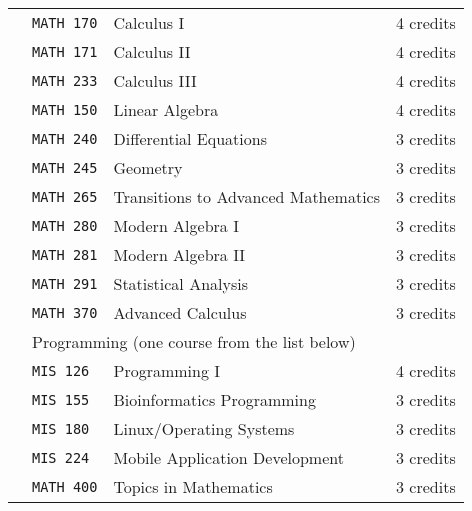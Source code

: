 \documentclass[letterpaper,10pt]{article}
\newcounter{cseNum}
\newcommand\csenumber{\stepcounter{cseNum}\arabic{cseNum}}
\begin{document}
\begin{tabular}{l l l l }
  \csenumber & \texttt{MATH 170} & Calculus I & 4 credits \\[4pt]
  \csenumber & \texttt{MATH 171} & Calculus II  & 4 credits \\[4pt]
  \csenumber & \texttt{MATH 233} & Calculus III  & 4 credits \\[4pt]
  \csenumber & \texttt{MATH 150} & Linear Algebra & 4 credits \\[4pt]
  \csenumber & \texttt{MATH 240} & Differential Equations & 3 credits \\[4pt]
  \csenumber & \texttt{MATH 245} & Geometry               & 3 credits \\[4pt]
  \csenumber & \texttt{MATH 265} & Transitions to Advanced Mathematics & 3 credits \\[4pt]
  \csenumber & \texttt{MATH 280} & Modern Algebra I & 3 credits \\[4pt]
  \csenumber & \texttt{MATH 281} & Modern Algebra II & 3 credits \\[4pt]
  \csenumber & \texttt{MATH 291} & Statistical Analysis  & 3 credits \\[4pt]
  \csenumber & \texttt{MATH 370} & Advanced Calculus & 3 credits \\[4pt]
  \csenumber & \multicolumn{3}{l}{ Programming (one course from the list below)}\\  
     & \texttt{MIS 126} & Programming I &  4 credits \\
     & \texttt{MIS 155} & Bioinformatics Programming &  3 credits \\
     & \texttt{MIS 180} & Linux/Operating Systems &  3 credits \\
     & \texttt{MIS 224} & Mobile Application Development &  3 credits \\[4pt]
  \csenumber & \texttt{MATH 400} & Topics in Mathematics & 3 credits \\[4pt]
\end{tabular}
\end{document}
